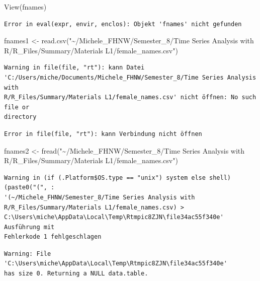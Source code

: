 \documentclass[
  letterpaper,
  DIV=11,
  numbers=noendperiod]{scrartcl}
\newenvironment{Shaded}{\begin{snugshade}}{\end{snugshade}}
\newcommand{\FunctionTok}[1]{\textcolor[rgb]{0.28,0.35,0.67}{#1}}
\newcommand{\NormalTok}[1]{\textcolor[rgb]{0.00,0.23,0.31}{#1}}
\newcommand{\OtherTok}[1]{\textcolor[rgb]{0.00,0.23,0.31}{#1}}
\newcommand{\StringTok}[1]{\textcolor[rgb]{0.13,0.47,0.30}{#1}}
\begin{document}
\begin{Shaded}
\begin{Highlighting}[]
\FunctionTok{View}\NormalTok{(fnames)}
\end{Highlighting}
\end{Shaded}

\begin{verbatim}
Error in eval(expr, envir, enclos): Objekt 'fnames' nicht gefunden
\end{verbatim}

\begin{Shaded}
\begin{Highlighting}[]
\NormalTok{fnames1 }\OtherTok{\textless{}{-}} \FunctionTok{read.csv}\NormalTok{(}\StringTok{"\textasciitilde{}/Michele\_FHNW/Semester\_8/Time Series Analysis with R/R\_Files/Summary/Materials L1/female\_names.csv"}\NormalTok{)}
\end{Highlighting}
\end{Shaded}

\begin{verbatim}
Warning in file(file, "rt"): kann Datei
'C:/Users/miche/Documents/Michele_FHNW/Semester_8/Time Series Analysis with
R/R_Files/Summary/Materials L1/female_names.csv' nicht öffnen: No such file or
directory
\end{verbatim}

\begin{verbatim}
Error in file(file, "rt"): kann Verbindung nicht öffnen
\end{verbatim}

\begin{Shaded}
\begin{Highlighting}[]
\NormalTok{fnames2 }\OtherTok{\textless{}{-}} \FunctionTok{fread}\NormalTok{(}\StringTok{"\textasciitilde{}/Michele\_FHNW/Semester\_8/Time Series Analysis with R/R\_Files/Summary/Materials L1/female\_names.csv"}\NormalTok{)}
\end{Highlighting}
\end{Shaded}

\begin{verbatim}
Warning in (if (.Platform$OS.type == "unix") system else shell)(paste0("(", :
'(~/Michele_FHNW/Semester_8/Time Series Analysis with
R/R_Files/Summary/Materials L1/female_names.csv) >
C:\Users\miche\AppData\Local\Temp\Rtmpic8ZJN\file34ac55f340e' Ausführung mit
Fehlerkode 1 fehlgeschlagen
\end{verbatim}

\begin{verbatim}
Warning: File 'C:\Users\miche\AppData\Local\Temp\Rtmpic8ZJN\file34ac55f340e'
has size 0. Returning a NULL data.table.
\end{verbatim}
\end{document}
